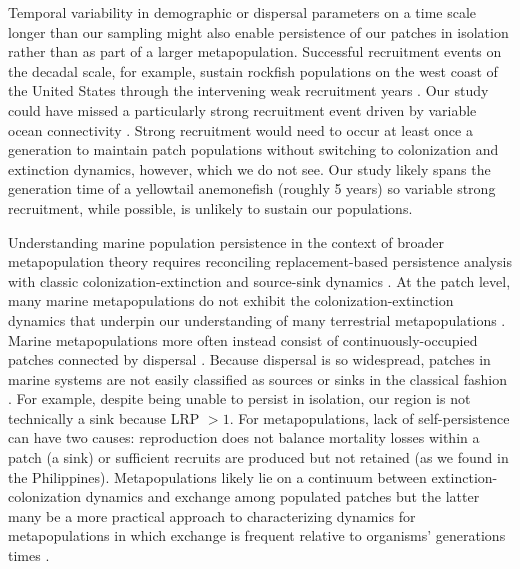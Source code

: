 \documentclass[12pt, oneside]{article}   	%
\begin{document}
Temporal variability in demographic or dispersal parameters on a time scale longer than our sampling might also enable persistence of our patches in isolation \citep[similar to the storage effect,][]{warner1985coexistence} rather than as part of a larger metapopulation. Successful recruitment events on the decadal scale, for example, sustain rockfish populations on the west coast of the United States through the intervening weak recruitment years \citep[e.g.][]{tolimieri2005roles}. Our study could have missed a particularly strong recruitment event driven by variable ocean connectivity \citep[simulations suggest that 20 years are necessary to capture the full extent of ocean variability in the Coral Triangle region surrounding our patches;][]{thompson2018variability}. Strong recruitment would need to occur at least once a generation to maintain patch populations without switching to colonization and extinction dynamics, however, which we do not see. Our study likely spans the generation time of a yellowtail anemonefish (roughly 5 years) so variable strong recruitment, while possible, is unlikely to sustain our populations.

Understanding marine population persistence in the context of broader metapopulation theory requires reconciling replacement-based persistence analysis with classic colonization-extinction and source-sink dynamics \citep{sale2006merging}. At the patch level, many marine metapopulations do not exhibit the colonization-extinction dynamics \citep[or do only on a decades to centuries timescale,][]{smedbol2002myths} that underpin our understanding of many terrestrial metapopulations \citep[e.g,][]{hanski1998metapopulation, moilanen1998long}. Marine metapopulations more often instead consist of continuously-occupied patches connected by dispersal \citep{kritzer2006marine}. Because dispersal is so widespread, patches in marine systems are not easily classified as sources or sinks in the classical fashion \citep{figueira2006defining, white2011oceanographic}. For example, despite being unable to persist in isolation, our region is not technically a sink \citep{pulliam1988sources} because LRP $> 1$. For metapopulations, lack of self-persistence can have two causes: reproduction does not balance mortality losses within a patch (a sink) or sufficient recruits are produced but not retained (as we found in the Philippines). Metapopulations likely lie on a continuum between extinction-colonization dynamics and exchange among populated patches \citep{kritzer2006marine} but the latter many be a more practical approach to characterizing dynamics for metapopulations in which exchange is frequent relative to organisms' generations times \citep{hastings_persistence_2006}. %
\end{document}
